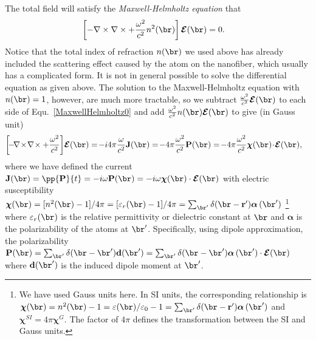 \documentclass[]{report}
\begin{document}
The total field will satisfy the \textit{Maxwell-Helmholtz equation} that
\begin{align}
\left[ -\nabla\times\nabla\times+\frac{\omega^2}{c^2}n^2(\br) \right] \boldsymbol{\mathcal{E}}(\br) &=0. \label{MaxwellHelmholtz0}
\end{align}
Notice that the total index of refraction $ n(\br) $ we used above has already included the scattering effect caused by the atom on the nanofiber, which usually has a complicated form. It is not in general possible to solve the differential equation as given above. The solution to the Maxwell-Helmholtz equation with $ n(\br)=1 $, however, are much more tractable, so we subtract $ \frac{\omega^2}{c^2} \boldsymbol{\mathcal{E}}(\br)$ to each side of Equ.~\ref{MaxwellHelmholtz0} and add $ \frac{\omega^2}{c^2}n(\br) \boldsymbol{\mathcal{E}}(\br) $ to give (in Gauss unit)
\begin{align}\label{eq:Maxwellwithsource}
\left[\! -\! \nabla\!\times\!\nabla\!\times + \frac{\omega^2}{c^2} \right]\! \boldsymbol{\mathcal{E}}(\br) &=\! -i4\pi\frac{\omega}{c^2} \mathbf{J}(\br) =\! -4\pi\frac{\omega^2}{c^2} \mathbf{P}(\br)=\! -4\pi \frac{\omega^2}{c^2} \boldsymbol{\chi}(\br)\! \cdot\! \boldsymbol{\mathcal{E}}(\br),
\end{align}
where we have defined the current $ \mathbf{J}(\br)=\pp{\mathbf{P}}{t}=-i\omega\mathbf{P}(\br)=-i\omega \boldsymbol{\chi}(\br)\cdot \boldsymbol{\mathcal{E}}(\br) $ with electric susceptibility $ \boldsymbol{\chi}(\br)=[n^2(\br)-1]/4\pi=[\varepsilon_r(\br)-1]/4\pi = \sum_{\br'}\delta(\br-\mathbf{r}')\boldsymbol{\alpha} \, (\br')$ \footnote{We have used Gauss units here. In SI units, the corresponding relationship is $ \boldsymbol{\chi}(\br)=n^2(\br)-1=\varepsilon(\br)/\varepsilon_0-1 = \sum_{\br'}\delta(\br-\mathbf{r}')\boldsymbol{\alpha} \, (\br')$ and $\boldsymbol{\chi}^{SI}=4\pi\boldsymbol{\chi}^{G}  $. The factor of $ 4\pi $ defines the transformation between the SI and Gauss units. } where $ \varepsilon_r(\br) $ is the relative permittivity or dielectric constant at $ \br $ and $ \boldsymbol{\alpha} $ is the polarizability of the atoms at $ \br' $. Specifically, using dipole approximation, the polarizability $ \mathbf{P}(\br)=\sum_{\br'}\delta(\br-\br')\mathbf{d}(\br')=\sum_{\br'}\delta(\br-\br')\boldsymbol{\alpha} \, (\br')\cdot \boldsymbol{\mathcal{E}}(\br) $ where $ \mathbf{d}(\br') $ is the induced dipole moment at $ \br' $.
\end{document}
